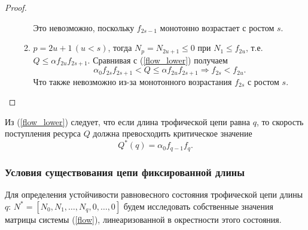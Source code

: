 \begin{proof}
\begin{enumerate}
\begin{enumerate}
                    Это невозможно, поскольку \(f_{2s-1}\) монотонно возрастает с ростом \(s\).

                    \item \(p = 2u+1 \, (u < s)\), тогда \( N_p = N_{2u+1} \leq 0 \) при \(N_1 \leq f_{2u}\), т.е. \( Q \leq \alpha f_{2u} f_{2s+1} \). Сравнивая с (\ref{flow_lower}) получаем
                    \begin{equation*}
                        \alpha_0 f_{2s} f_{2s+1} < Q \leq \alpha f_{2u} f_{2s+1} \Rightarrow f_{2s} < f_{2u}.
                    \end{equation*}
                    Что также невозможно из-за монотонного возрастания \(f_{2s}\) с ростом \(s\). 
                \end{enumerate}
            \end{enumerate}
        \end{proof}
        
        \begin{corollary}
            Из (\ref{flow_lower}) следует, что если длина трофической цепи равна \(q\), то скорость поступления ресурса \( Q \) должна превосходить критическое значение 
            \begin{equation*}
                Q^* (q) = \alpha_0 f_{q-1} f_{q}.
            \end{equation*}
        \end{corollary}

        \subsubsection{Условия существования цепи фиксированной длины}

        Для определения устойчивости равновесного состояния трофической цепи длины \(q\): \(N^* = [ N_0, N_1, \dots, N_q, 0, \dots, 0 ]\) будем исследовать собственные значения матрицы системы (\ref{flow}), линеаризованной в окрестности этого состояния.
        
